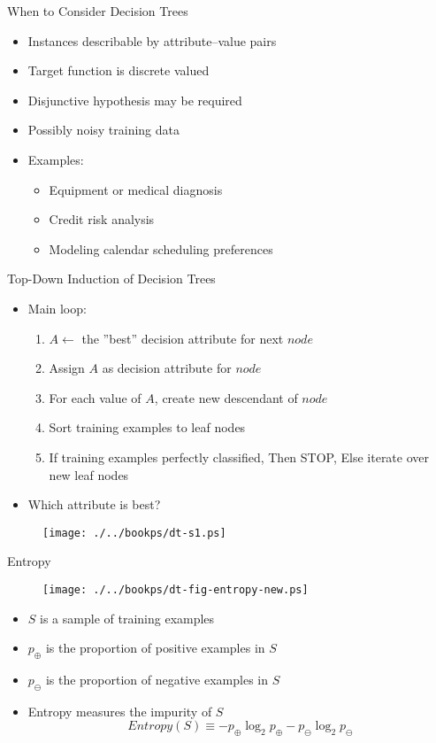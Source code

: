 \documentclass[%
pdf,
colorBG,
slideColor,
tcrico,
]{prosper}
\begin{document}
\begin{slide}{When to Consider Decision Trees } 
\begin{itemize}
\item Instances describable by attribute--value pairs
\item Target function is discrete valued
\item Disjunctive hypothesis may be required
\item Possibly noisy training data
\end{itemize}

\begin{itemize}
\item Examples:
	\begin{itemize}
	\item Equipment or medical diagnosis
	\item Credit risk analysis
	\item Modeling calendar scheduling preferences 
	\end{itemize}
\end{itemize}
\end{slide}

\begin{slide}{Top-Down Induction of Decision Trees} 
\begin{itemize}
\item Main loop:
	\begin{enumerate}
	\item $A \gets$ the ''best'' decision attribute for next $node$
	\item Assign $A$ as decision attribute for $node$
	\item For each value of $A$, create new descendant of $node$
	\item Sort training examples to leaf nodes
	\item If training examples perfectly classified, Then STOP, Else iterate over new leaf nodes
	\end{enumerate}
\item Which attribute is best? 
\end{itemize}
\begin{figure}
	\centering
	\texttt{[image: ./../bookps/dt-s1.ps]}
\end{figure}
\end{slide}


\begin{slide}{Entropy} 
\begin{figure}
	\centering
	\texttt{[image: ./../bookps/dt-fig-entropy-new.ps]}
\end{figure}
\tiny
\begin{itemize}
\item $S$ is a sample of training examples
\item $p_{\oplus}$ is the proportion of positive examples in $S$
\item $p_{\ominus}$ is the proportion of negative examples in $S$
\item Entropy measures the impurity of $S$
\[ Entropy(S) \equiv  - p_{\oplus} \log_{2} p_{\oplus} -  p_{\ominus} \log_{2}
p_{\ominus} \]
\end{itemize}
\end{slide}
\end{document}
